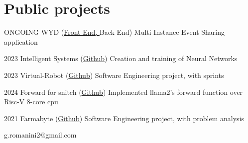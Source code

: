 \documentclass{tccv}
\begin{document}
\section{Public projects}

\begin{yearlist}
      \item{ONGOING}
            {WYD (\href{https://github.com/RedDuality/WYD}{Front End, } Back End)}
            {Multi-Instance Event Sharing application}
      \item{2023}
            {Intelligent Systems (\href{https://github.com/RedDuality/IntelligentSystems}{Github})}
            {Creation and training of Neural Networks}
      \item{2023}
            {Virtual-Robot (\href{https://github.com/RedDuality/issLab23}{Github})}
            {Software Engineering project, with sprints}
      \item{2024}
            {Forward for snitch (\href{https://github.com/RedDuality/snitch_forward}{Github})}
            {Implemented llama2's forward function over Risc-V 8-core cpu}
      \item{2021}
            {Farmabyte (\href{https://github.com/lorenzo9uerra/farmabyte-doc} {Github})}
            {Software Engineering project, with problem analysis}
            
\end{yearlist}


{g.romanini2@gmail.com}
{}
\end{document}
